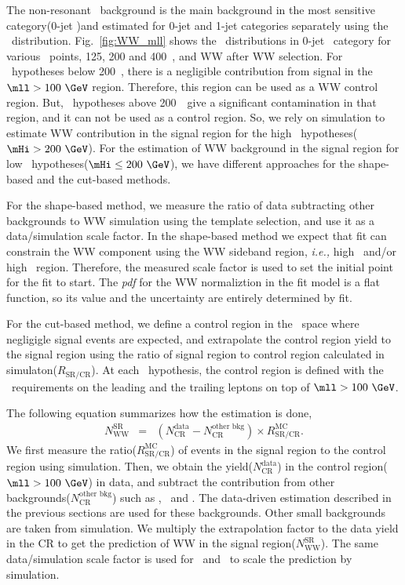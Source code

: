 The non-resonant \WW\ background is the main background in the most sensitive 
category(0-jet \DF)and estimated for 0-jet and 1-jet categories separately 
using the \mll\ distribution.
Fig.~\ref{fig:WW_mll} shows the \mll\ distributions in 0-jet \DF\ 
category for various \mHi\ points, 125, 200 and 400~\GeV, and WW after WW selection. 
For \mHi\ hypotheses below 200~\GeV, 
there is a negligible contribution from signal in the $\mll>100~\GeV$ region. 
Therefore, this region can be used as a WW control region.  
But, \mHi\ hypotheses above 200~\GeV\ give a significant contamination in that region,
and it can not be used as a control region. So, we rely on simulation
to estimate WW contribution in the signal region for the high \mHi\ hypotheses($\mHi>200~\GeV$). 
For the estimation of WW background in the signal region 
for low \mHi\ hypotheses($\mHi\le200~\GeV$), 
we have different approaches for the shape-based and the cut-based methods. 

For the shape-based method, we measure the ratio of data subtracting other backgrounds 
to WW simulation using the template selection, and use it as a data/simulation scale factor. 
In the shape-based method we expect that fit can constrain the WW component using 
the WW sideband region, \textit{i.e.,} high \mT\ and/or high \mll\ region. Therefore,   
the measured scale factor is used to set the initial point for the fit to start. 
The \textit{pdf} for the WW normaliztion in the fit model is a flat function, 
so its value and the uncertainty are entirely determined by fit. 

For the cut-based method, we define a control region in the \mll\ space where 
negligigle signal events are expected, and extrapolate the control region yield 
to the signal region using the ratio of signal region to control region calculated 
in simulaton($R_{\textrm{SR/CR}}$). 
At each \mHi\ hypothesis, the control region is defined with the \pt\ requirements 
on the leading and the trailing leptons on top of $\mll>100~\GeV$. 

The following equation summarizes how the estimation is done, 
\begin{eqnarray} 
N_{\textrm{WW}}^{\textrm{SR}} 
&=&  
\left( N_{\textrm{CR}}^{\textrm{data}}  
     - N_{\textrm{CR}}^{\textrm{other bkg}}\right) \times R_\textrm{SR/CR}^{\textrm{MC}}.  
\end{eqnarray} 
We first measure the ratio($R_\textrm{SR/CR}^{\textrm{MC}}$) of events in the signal region 
to the control region using simulation.  
Then, we obtain the yield($N_{\textrm{CR}}^{\textrm{data}}$) in the 
control region($\mll>100~\GeV$) in data, and subtract the contribution from other 
backgrounds($N_{\textrm{CR}}^{\textrm{other bkg}}$) such as \topbkg, \Wjets\ and \dyll.  
The data-driven estimation described in the previous sections are used for 
these backgrounds. Other small backgrounds are taken from simulation. 
We multiply the extrapolation factor to the data yield in the CR 
to get the prediction of WW in the signal region($N_{\textrm{WW}}^{\textrm{SR}}$).
The same data/simulation scale factor is used for \qqww\ and \ggww\ to scale 
the prediction by simulation. 

